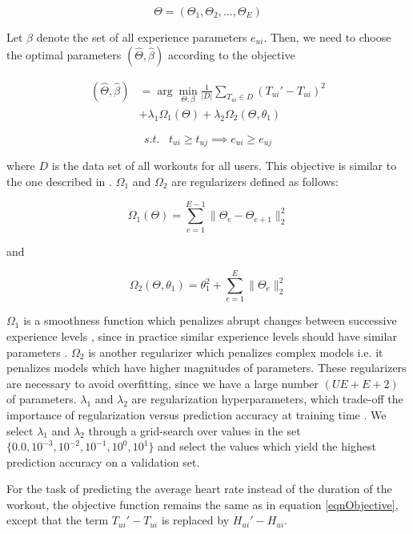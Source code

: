 \documentclass{acm_proc_article-sp}
\begin{document}
$$\Theta = (\Theta_1, \Theta_2,..., \Theta_E)$$

Let $\beta$ denote the set of all experience parameters $e_{ui}$. Then, we need to choose the optimal parameters $(\hat{\Theta}, \hat{\beta})$ according to the objective


\begin{align}
\label{eqnObjective}
(\hat{\Theta}, \hat{\beta})  &= \arg\min_{\Theta,\beta}\frac{1}{|D|} \sum_{T_{ui} \in D}(T_{ui}' - T_{ui})^2 \nonumber \\
 & + \lambda_1\Omega_1(\Theta) + \lambda_2\Omega_2(\Theta, \theta_1)
\end{align}

$$s.t. \; \; \; t_{ui} \geq t_{uj} \implies e_{ui} \geq e_{uj} $$

where $D$ is the data set of all workouts for all users. This objective is similar to the one described in \cite{www13}. $\Omega_1$ and $\Omega_2$ are regularizers defined as follows:

$$\Omega_1(\Theta) = \sum_{e=1}^{E-1}{\|\Theta_e - \Theta_{e+1}\|_2^2}$$

and

$$\Omega_2(\Theta, \theta_1) = \theta_1^2 + \sum_{e=1}^{E}{\|\Theta_e \|_2^2}$$

$\Omega_1$ is a smoothness function which penalizes abrupt changes between successive experience levels \cite{www13}, since in practice similar experience levels should have similar parameters \cite{www13}. $\Omega_2$ is another regularizer which penalizes complex models i.e. it penalizes models which have higher magnitudes of parameters. These regularizers are necessary to avoid overfitting, since we have a large number $(UE + E + 2)$ of parameters. $\lambda_1$ and $\lambda_2$ are regularization hyperparameters, which trade-off the importance of regularization versus prediction accuracy at training time \cite{www13}. We select $\lambda_1$ and $\lambda_2$ through a grid-search over values in the set $\{0.0, 10^{-3}, 10^{-2}, 10^{-1}, 10^0, 10^1\}$ and select the values which yield the highest prediction accuracy on a validation set.

For the task of predicting the average heart rate instead of the duration of the workout, the objective function remains the same as in equation \ref{eqnObjective}, except that the term $T_{ui}' - T_{ui}$ is replaced by $H_{ui}' - H_{ui}$.
\end{document}
